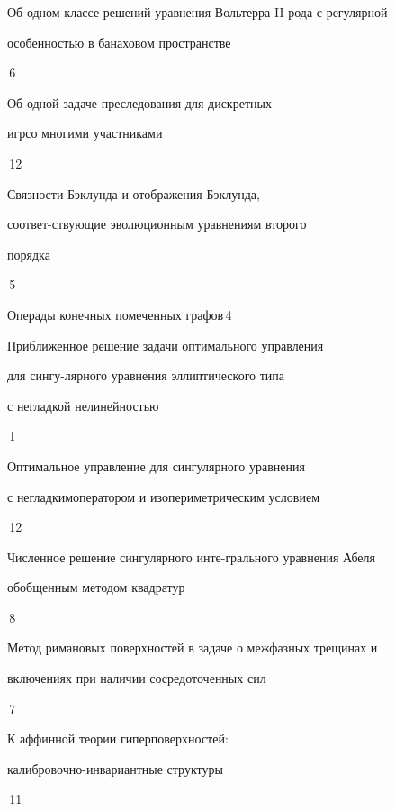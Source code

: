 {Об одном классе решений уравнения Вольтерра II рода с регулярной\newline 


особенностью в банаховом пространстве}{\No\,6}




{Об одной задаче преследования для дискретных


игр\newline со многими участниками}{\No\,12}




{Связности Бэклунда и отображения Бэклунда,


соответ-\newline ствующие эволюционным уравнениям второго


порядка}{\No\,5}




{Операды конечных помеченных графов}{\No\,4}




{Приближенное решение задачи оптимального управления 


для сингу-\newline лярного уравнения эллиптического типа 


с негладкой нелинейностью}{\No\,1}




{Оптимальное управление для сингулярного уравнения 


с негладким\newline оператором и изопериметрическим условием}{\No\,12}




{Численное решение сингулярного инте-\newline грального уравнения Абеля


обобщенным методом квадратур}{\No\,8}




{Метод римановых поверхностей в задаче о межфазных трещинах и\newline 


включениях при наличии сосредоточенных сил}{\No\,7}




{К аффинной теории гиперповерхностей: 


калибровочно-инвариантные структуры}{\No\,11}



